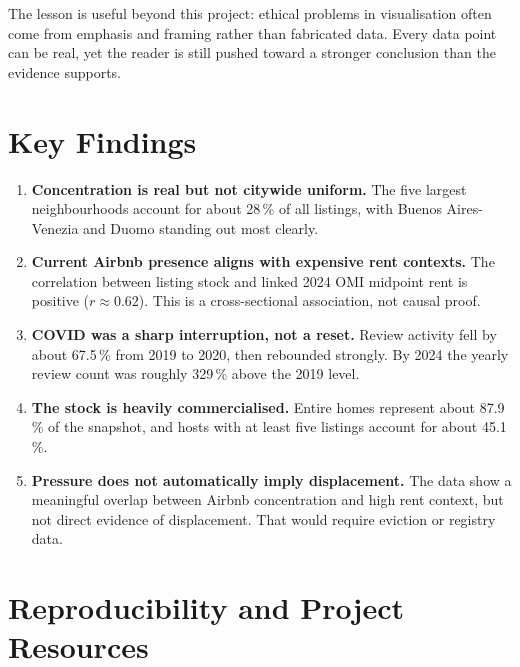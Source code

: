 \documentclass[11pt, a4paper]{article}
\begin{document}
The lesson is useful beyond this project: ethical problems in visualisation often come from
emphasis and framing rather than fabricated data. Every data point can be real, yet the
reader is still pushed toward a stronger conclusion than the evidence supports.

\section{Key Findings}
\label{sec:findings}

\begin{enumerate}[leftmargin=1.6em]
  \item \textbf{Concentration is real but not citywide uniform.}
        The five largest neighbourhoods account for about 28\,\% of all listings, with
        Buenos Aires-Venezia and Duomo standing out most clearly.

  \item \textbf{Current Airbnb presence aligns with expensive rent contexts.}
        The correlation between listing stock and linked 2024 OMI midpoint rent is positive
        ($r \approx 0.62$). This is a cross-sectional association, not causal proof.

  \item \textbf{COVID was a sharp interruption, not a reset.}
        Review activity fell by about 67.5\,\% from 2019 to 2020, then rebounded strongly.
        By 2024 the yearly review count was roughly 329\,\% above the 2019 level.

  \item \textbf{The stock is heavily commercialised.}
        Entire homes represent about 87.9\,\% of the snapshot, and hosts with at least five
        listings account for about 45.1\,\%.

  \item \textbf{Pressure does not automatically imply displacement.}
        The data show a meaningful overlap between Airbnb concentration and high rent context,
        but not direct evidence of displacement. That would require eviction or registry data.
\end{enumerate}

\section{Reproducibility and Project Resources}
\label{sec:resources}
\end{document}
